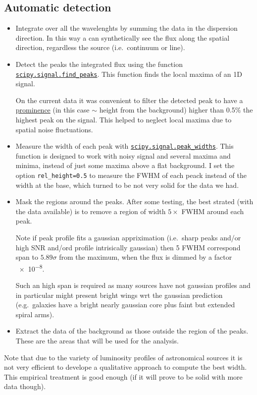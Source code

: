 \documentclass{article}
\begin{document}
\subsection{Automatic detection}
\begin{itemize}
	\item Integrate over all the wavelenghts by summing the data in the dispersion direction. In this way a can synthetically see the flux along the spatial direction, regardless the source (i.e.\ continuum or line).
	\item Detect the peaks the integrated flux using the function \href{https://docs.scipy.org/doc/scipy/reference/generated/scipy.signal.find_peaks.html}{\texttt{scipy.signal.find\_peaks}}. This function finds the local maxima of an 1D signal.
	
	On the current data it was convenient to filter the detected peak to have a \href{https://en.wikipedia.org/wiki/Topographic_prominence}{prominence} (in this case $\sim$ height from the background) higher than 0.5\% the highest peak on the signal. This helped to neglect local maxima due to spatial noise fluctuations.
	
	\item Measure the width of each peak with \href{https://docs.scipy.org/doc/scipy/reference/generated/scipy.signal.peak_widths.html#scipy.signal.peak_widths}{\texttt{scipy.signal.peak\_widths}}. This function is designed to work with noisy signal and several maxima and minima, instead of just some maxima above a flat background. I set the option \texttt{rel\_height=0.5} to measure the FWHM of each peack instead of the width at the base, which turned to be not very solid for the data we had.
	
	\item Mask the regions around the peaks. After some testing, the best strated (with the data available) is to remove a region of width $ 5\times$ FWHM around each peak.
	
	Note if peak profile fits a gaussian appriximation (i.e.\ sharp peaks and/or high SNR and/ord profile intrisically gaussian) then 5 FWHM correspond span to $5.89\sigma$ from the maximum, when the flux is dimmed by a factor \num{e-8}.
	
	Such an high span is required as many sources have not gaussian profiles and in particular might present bright wings wrt the gaussian prediction (e.g.\ galaxies have a bright nearly gaussian core plus faint but extended spiral arms).
	
	\item Extract the data of the background as those outside the region of the peaks. These are the areas that will be used for the analysis.
\end{itemize}
Note that due to the variety of luminosity profiles of astronomical sources it is not very efficient to develope a qualitative approach to compute the best width. This empirical treatment is good enough (if it will prove to be solid with more data though).
\end{document}

